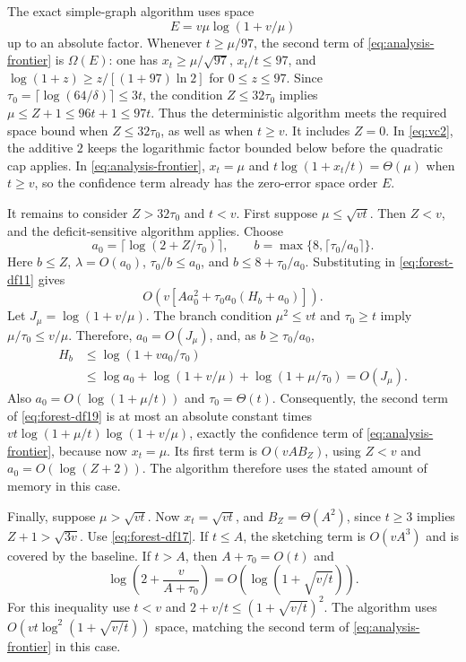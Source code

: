 \documentclass[11pt,letterpaper]{article}
\numberwithin{equation}{section}
\begin{document}
The exact simple-graph algorithm uses space
\begin{equation}
E=v\mu\log(1+v/\mu)                                \label{eq:forest-df18}
\end{equation}
up to an absolute factor.
Whenever $t\ge\mu/97$, the second term of \eqref{eq:analysis-frontier} is $\Omega(E)$: one has $x_t\ge\mu/\sqrt{97}$, $x_t/t\le97$, and $\log(1+z)\ge z/[(1+97)\ln2]$ for $0\le z\le97$.
Since $\tau_0=\lceil\log(64/\delta)\rceil\le3t$, the condition $Z\le32\tau_0$ implies $\mu\le Z+1\le96t+1\le97t$.
Thus the deterministic algorithm meets the required space bound when $Z\le32\tau_0$, as well as when $t\ge v$.
It includes $Z=0$.
In \eqref{eq:vc2}, the additive $2$ keeps the logarithmic factor bounded below before the quadratic cap applies.
In \eqref{eq:analysis-frontier}, $x_t=\mu$ and $t\log(1+x_t/t)=\Theta(\mu)$ when $t\ge v$, so the confidence term already has the zero-error space order $E$.

It remains to consider $Z>32\tau_0$ and $t<v$.
First suppose $\mu\le\sqrt{vt}$.
Then $Z<v$, and the deficit-sensitive algorithm applies.
Choose
\[
 a_0=\lceil\log(2+Z/\tau_0)\rceil,\qquad
 b=\max\{8,\lceil \tau_0/a_0\rceil\}.
\]
Here $b\le Z$, $\lambda=O(a_0)$, $\tau_0/b\le a_0$, and $b\le8+\tau_0/a_0$.
Substituting in \eqref{eq:forest-df11} gives
\begin{equation}
O\left(v\left[Aa_0^2+
                 \tau_0 a_0(H_b+a_0)\right]\right).        \label{eq:forest-df19}
\end{equation}
Let $J_\mu=\log(1+v/\mu)$.
The branch condition $\mu^2\le vt$ and $\tau_0\ge t$ imply $\mu/\tau_0\le v/\mu$.
Therefore, $a_0=O(J_\mu)$, and, as $b\ge \tau_0/a_0$,
\[
 \begin{split}
 H_b&\le\log(1+va_0/\tau_0)\\
    &\le\log a_0+\log(1+v/\mu)+\log(1+\mu/\tau_0)
      =O(J_\mu).
 \end{split}
\]
Also $a_0=O(\log(1+\mu/t))$ and $\tau_0=\Theta(t)$.
Consequently, the second term of \eqref{eq:forest-df19} is at most an absolute constant times $vt\log(1+\mu/t)\log(1+v/\mu)$, exactly the confidence term of \eqref{eq:analysis-frontier}, because now $x_t=\mu$.
Its first term is $O(vAB_Z)$, using $Z<v$ and $a_0=O(\log(Z+2))$.
The algorithm therefore uses the stated amount of memory in this case.

Finally, suppose $\mu>\sqrt{vt}$.
Now $x_t=\sqrt{vt}$, and $B_Z=\Theta(A^2)$, since $t\ge3$ implies $Z+1>\sqrt{3v}$.
Use \eqref{eq:forest-df17}.
If $t\le A$, the sketching term is $O(vA^3)$ and is covered by the baseline.
If $t>A$, then $A+\tau_0=O(t)$ and
\[
 \log\left(2+\frac v{A+\tau_0}\right)
   =O\left(\log(1+\sqrt{v/t})\right).
\]
For this inequality use $t<v$ and $2+v/t\le(1+\sqrt{v/t})^2$.
The algorithm uses $O(vt\log^2(1+\sqrt{v/t}))$ space, matching the second term of \eqref{eq:analysis-frontier} in this case.
\end{document}
